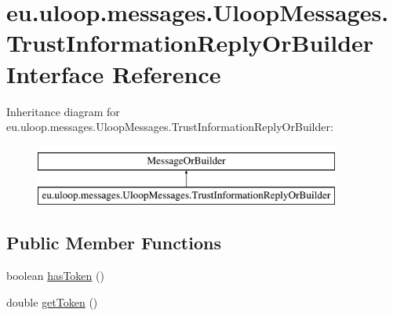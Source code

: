 \hypertarget{interfaceeu_1_1uloop_1_1messages_1_1UloopMessages_1_1TrustInformationReplyOrBuilder}{\section{eu.\+uloop.\+messages.\+Uloop\+Messages.\+Trust\+Information\+Reply\+Or\+Builder Interface Reference}
\label{interfaceeu_1_1uloop_1_1messages_1_1UloopMessages_1_1TrustInformationReplyOrBuilder}
}
Inheritance diagram for eu.\+uloop.\+messages.\+Uloop\+Messages.\+Trust\+Information\+Reply\+Or\+Builder\+:\begin{figure}[H]
\begin{center}
\leavevmode
\includegraphics[height=2.000000cm]{interfaceeu_1_1uloop_1_1messages_1_1UloopMessages_1_1TrustInformationReplyOrBuilder}
\end{center}
\end{figure}
\subsection*{Public Member Functions}
\begin{DoxyCompactItemize}
\item 
boolean \hyperlink{interfaceeu_1_1uloop_1_1messages_1_1UloopMessages_1_1TrustInformationReplyOrBuilder_aee12fe0d59ab7bc2236e99a1fd27f122}{has\+Token} ()
\item 
double \hyperlink{interfaceeu_1_1uloop_1_1messages_1_1UloopMessages_1_1TrustInformationReplyOrBuilder_aa51a4461cca37c8da462d8e764db827d}{get\+Token} ()
\end{DoxyCompactItemize}


